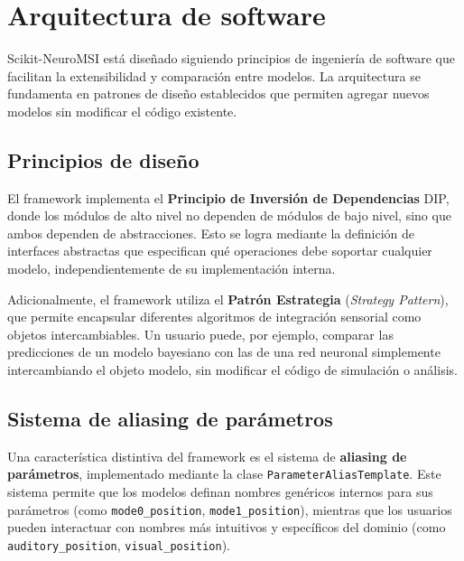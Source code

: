 
\section{Arquitectura de software}
\label{sec:snmsi_arquitectura}

Scikit-NeuroMSI está diseñado siguiendo principios de ingeniería de software que facilitan la extensibilidad y comparación entre modelos. La arquitectura se fundamenta en patrones de diseño establecidos que permiten agregar nuevos modelos sin modificar el código existente.

\subsection{Principios de diseño}
\label{subsec:snmsi_principios}

El framework implementa el \textbf{Principio de Inversión de Dependencias} \acrfull{DIP}, donde los módulos de alto nivel no dependen de módulos de bajo nivel, sino que ambos dependen de abstracciones. Esto se logra mediante la definición de interfaces abstractas que especifican qué operaciones debe soportar cualquier modelo, independientemente de su implementación interna.

Adicionalmente, el framework utiliza el \textbf{Patrón Estrategia} (\textit{Strategy Pattern}), que permite encapsular diferentes algoritmos de integración sensorial como objetos intercambiables. Un usuario puede, por ejemplo, comparar las predicciones de un modelo bayesiano con las de una red neuronal simplemente intercambiando el objeto modelo, sin modificar el código de simulación o análisis.

\subsection{Sistema de aliasing de parámetros}
\label{subsec:snmsi_aliasing}

Una característica distintiva del framework es el sistema de \textbf{aliasing de parámetros}, implementado mediante la clase \texttt{ParameterAliasTemplate}. Este sistema permite que los modelos definan nombres genéricos internos para sus parámetros (como \texttt{mode0\_position}, \texttt{mode1\_position}), mientras que los usuarios pueden interactuar con nombres más intuitivos y específicos del dominio (como \texttt{auditory\_position}, \texttt{visual\_position}).

